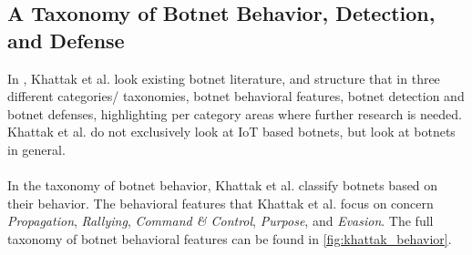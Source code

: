 \documentclass[a4paper,10pt]{article}
\begin{document}
% 

\subsection{A Taxonomy of Botnet Behavior, Detection, and Defense} \label{sec:literature_review:Khattak2014}
In \cite{Khattak2014}, Khattak et al. look existing botnet literature, and structure that in three different categories/
taxonomies, botnet behavioral features, botnet detection and botnet defenses, highlighting per category areas where
further research is needed. Khattak et al. do not exclusively look at IoT based botnets, but look at botnets in general.
\\\\
In the taxonomy of botnet behavior, Khattak et al. classify botnets based on their behavior. The behavioral features
that Khattak et al. focus on concern \textit{Propagation}, \textit{Rallying}, \textit{Command \& Control}, \textit{Purpose},
and \textit{Evasion}. The full taxonomy of botnet behavioral features can be found in \autoref{fig:khattak_behavior}.
\end{document}
